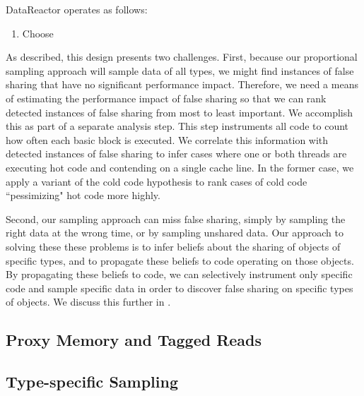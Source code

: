 \documentclass{sig-alternate}
\newcommand{\Toolname}{DataReactor}
\begin{document}
\Toolname{} operates as follows:
\begin{enumerate}
\item Choose 
\end{enumerate}

As described, this design presents two challenges. First, because our proportional sampling approach will sample
data of all types, we might find instances of false sharing that have no significant performance impact. Therefore,
we need a means of estimating the performance impact of false sharing so that we can rank detected instances of
false sharing from most to least important. We accomplish this as part of a separate analysis step. This step
instruments all code to count how often each basic block is executed. We correlate this information with detected
instances of false sharing to infer cases where one or both threads are executing hot code and contending on a single
cache line. In the former case, we apply a variant of the cold code hypothesis \cite{LiteRace} to rank cases of cold
code ``pessimizing" hot code more highly.

Second, our sampling approach can miss false sharing, simply by sampling the right data at the wrong time, or by
sampling unshared data. Our approach to solving these these problems is to infer beliefs about the sharing of
objects of specific types, and to propagate these beliefs to code operating on those objects. By propagating these
beliefs to code, we can selectively instrument only specific code and sample specific data in order to discover
false sharing on specific types of objects. We discuss this further in .

\subsection{Proxy Memory and Tagged Reads}\label{sec:proxymem}

\subsection{Type-specific Sampling}\label{sec:beliefs}

\end{document}
